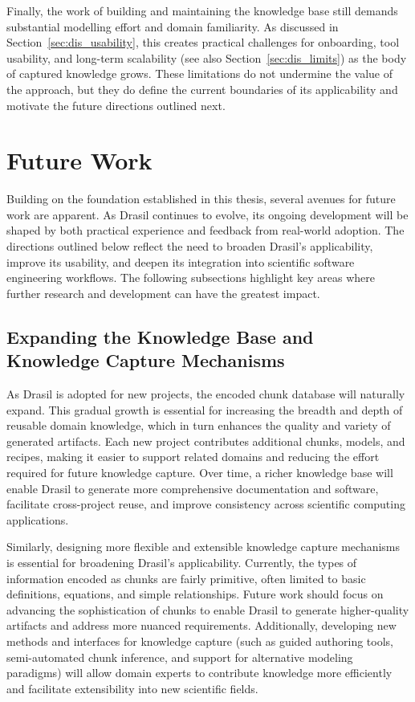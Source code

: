 Finally, the work of building and maintaining the knowledge base still demands
substantial modelling effort and domain familiarity. As discussed in
Section~\ref{sec:dis_usability}, this creates practical challenges for onboarding,
tool usability, and long-term scalability (see also Section~\ref{sec:dis_limits}) as the body of captured knowledge
grows. These limitations do not undermine the value of the approach, but they
do define the current boundaries of its applicability and motivate the future
directions outlined next.

\section{Future Work}
\label{sec:fw}

Building on the foundation established in this thesis, several avenues for
future work are apparent. As Drasil continues to evolve, its ongoing
development will be shaped by both practical experience and feedback from
real-world adoption. The directions outlined below reflect the need to
broaden Drasil's applicability, improve its usability, and deepen its
integration into scientific software engineering workflows. The following 
subsections highlight key areas where further research and development can
have the greatest impact.

\subsection{Expanding the Knowledge Base and Knowledge Capture Mechanisms}

As Drasil is adopted for new projects, the encoded chunk database will
naturally expand. This gradual growth is essential for increasing the
breadth and depth of reusable domain knowledge, which in turn enhances
the quality and variety of generated artifacts. Each new project
contributes additional chunks, models, and recipes, making it easier to
support related domains and reducing the effort required for future
knowledge capture. Over time, a richer knowledge base will enable Drasil
to generate more comprehensive documentation and software, facilitate
cross-project reuse, and improve consistency across scientific computing
applications.

Similarly, designing more flexible and extensible knowledge capture 
mechanisms is essential for broadening Drasil's applicability. Currently, 
the types of information encoded as chunks are fairly primitive, often 
limited to basic definitions, equations, and simple relationships. 
Future work should focus on advancing the sophistication of chunks to 
enable Drasil to generate higher-quality artifacts and address more nuanced 
requirements. Additionally, developing new methods and interfaces for knowledge
capture (such as guided authoring tools, semi-automated chunk inference, and 
support for alternative modeling paradigms) will allow domain experts to 
contribute knowledge more efficiently and facilitate extensibility into new 
scientific fields.

